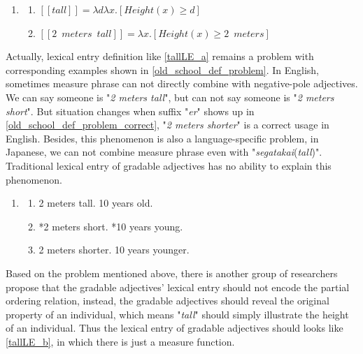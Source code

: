 \documentclass{ctexart}
\begin{document}
\begin{enumerate}[resume]

    \item \label{old_school_def_example_LE}
    
    \begin{enumerate}[ref=(\arabic{enumi}\alph*)]
        
        \item $[\![tall]\!]=\lambda d \lambda x.[Height(x) \geq d]$
        \item $[\![2 \enspace meters \enspace tall]\!]=\lambda x.[Height(x) \geq 2 \enspace meters]$

    \end{enumerate}

\end{enumerate}

Actually, lexical entry definition like \ref{tallLE_a} remains a problem with corresponding examples shown in \ref{old_school_def_problem}. In English, sometimes measure phrase can not directly combine with negative-pole adjectives. We can say someone is "\textit{2 meters tall}", but can not say someone is "\textit{2 meters short}". But situation changes when suffix "\textit{er}" shows up in \ref{old_school_def_problem_correct}, "\textit{2 meters shorter}" is a correct usage in English. Besides, this phenomenon is also a language-specific problem, in Japanese, we can not combine measure phrase even with "\textit{segatakai}(\textit{tall})". Traditional lexical entry of gradable adjectives has no ability to explain this phenomenon.

\begin{enumerate}[resume]

    \item \label{old_school_def_problem}
    
    \begin{enumerate}[ref=(\arabic{enumi}\alph*)]
        
        \item 2 meters tall. 10 years old.
        \item *2 meters short. *10 years young.
        \item \label{old_school_def_problem_correct} 2 meters shorter. 10 years younger.

    \end{enumerate}

\end{enumerate}

Based on the problem mentioned above, there is another group of researchers propose that the gradable adjectives' lexical entry should not encode the partial ordering relation, instead, the gradable adjectives should reveal the original property of an individual, which means "\textit{tall}" should simply illustrate the height of an individual. Thus the lexical entry of gradable adjectives should looks like \ref{tallLE_b}, in which there is just a measure function. 
\end{document}
